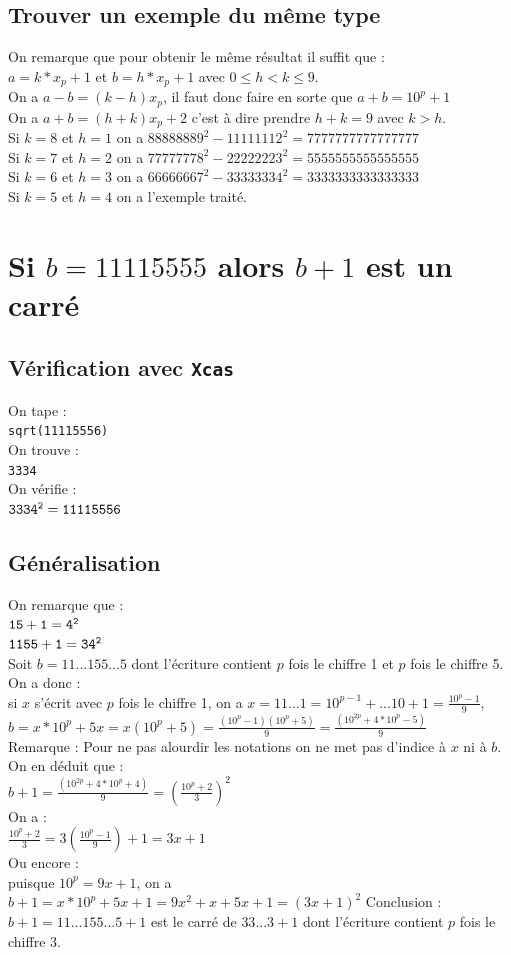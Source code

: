\documentclass[a4paper,11pt]{book}
\begin{document}
\subsection{Trouver un exemple du m\^eme type}
On remarque que pour obtenir le m\^eme r\'esultat il suffit que :\\
$a=k*x_p+1$ et $b=h*x_p+1$ avec $0 \leq h<k \leq 9$.\\
On a $a-b=(k-h)x_p$, il faut donc faire en sorte que
$a+b=10^p+1$\\
On a $a+b=(h+k)x_p+2$ c'est \`a dire prendre $h+k=9$ avec $k>h$.\\
Si $k=8$ et $h=1$ on a $88888889^2-11111112^2=7777777777777777$\\
Si $k=7$ et $h=2$ on a $77777778^2-22222223^2=5555555555555555$\\
Si $k=6$ et $h=3$ on a $66666667^2-33333334^2=3333333333333333$\\
Si $k=5$ et $h=4$ on a l'exemple trait\'e.
\section{Si $b=11115555$ alors $b+1$ est un carr\'e}
\subsection{V\'erification avec {\tt Xcas}}
\noindent On tape :\\
{\tt sqrt(11115556)}\\
On trouve :\\
{\tt 3334}\\
On v\'erifie :\\
${\tt 3334^2=11115556}$
\subsection{G\'en\'eralisation}
On remarque que :\\
${\tt 15+1=4^2}$\\
${\tt 1155+1=34^2}$\\
Soit $b=11...155...5$ dont l'\'ecriture contient $p$ fois le chiffre 1 et $p$  
fois le chiffre 5. 
On a donc :\\
si $x$ s'\'ecrit avec $p$ fois le chiffre 1, on a $x=11...1=10^{p-1}+...10+1=\frac{10^p-1}{9}$,\\
$b=x*10^p+5x=x(10^p+5)=\frac{(10^p-1)(10^p+5)}{9}=\frac{(10^{2p}+4*10^p-5)}{9}$\\
Remarque : Pour ne pas alourdir les notations on ne met pas d'indice \`a $x$ ni \`a $b$.\\
On en d\'eduit que :\\
$\displaystyle b+1=\frac{(10^{2p}+4*10^p+4)}{9}={(\frac{10^p+2}{3})}^2$\\
On a :\\
$\displaystyle\frac{10^p+2}{3}=3(\frac{10^p-1}{9})+1=3x+1$\\
Ou encore :\\
puisque $10^p=9x+1$, on a $b+1= x*10^p+5x+1=9x^2+x+5x+1=(3x+1)^2$
Conclusion :\\
$b+1=11...155...5+1$ est le carr\'e de $33...3+1$ dont l'\'ecriture contient 
$p$ fois le chiffre 3.
\end{document}
